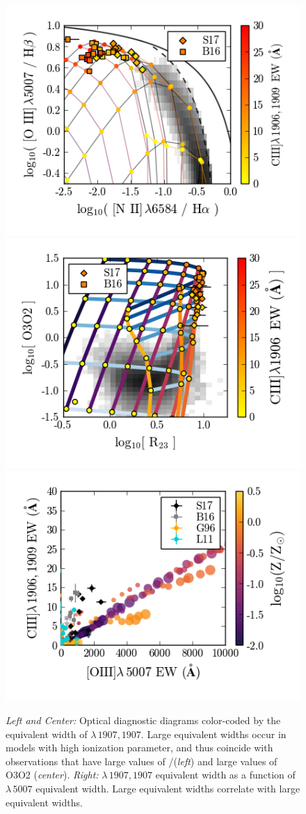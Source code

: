 \begin{figure}
  \begin{center}
    \includegraphics[width=0.283\linewidth]{figs/f18a.png}
    \includegraphics[width=0.283\linewidth]{figs/f18b.png}
    \includegraphics[width=0.283\linewidth]{figs/f18c.png}
    \caption{\emph{Left and Center:} Optical diagnostic diagrams color-coded by the equivalent width of \ciii$\lambda\,1907,1907$. Large \ciii equivalent widths occur in models with high ionization parameter, and thus coincide with observations that have large values of \oiii/\hb (\emph{left}) and large values of O3O2 (\emph{center}).  \emph{Right:} \ciii$\lambda\,1907,1907$ equivalent width as a function of \oiii$\lambda\,5007$ equivalent width. Large \ciii equivalent widths correlate with large \oiii equivalent widths.}
    \label{fig:CIIIBPT}
  \end{center}
\end{figure}


